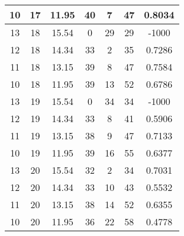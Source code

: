\documentclass[letterpaper, 12pt]{article}
\begin{document}
\begin{longtable}{|c|c|c|c|c|c|c|}
10 & 17 & 11.95 & 40 & 7 & 47 & 0.8034 \\
\hline
13 & 18 & 15.54 & 0 & 29 & 29 & -1000 \\
\hline
12 & 18 & 14.34 & 33 & 2 & 35 & 0.7286 \\
\hline
11 & 18 & 13.15 & 39 & 8 & 47 & 0.7584 \\
\hline
10 & 18 & 11.95 & 39 & 13 & 52 & 0.6786 \\
\hline
13 & 19 & 15.54 & 0 & 34 & 34 & -1000 \\
\hline
12 & 19 & 14.34 & 33 & 8 & 41 & 0.5906 \\
\hline
11 & 19 & 13.15 & 38 & 9 & 47 & 0.7133 \\
\hline
10 & 19 & 11.95 & 39 & 16 & 55 & 0.6377 \\
\hline
13 & 20 & 15.54 & 32 & 2 & 34 & 0.7031 \\
\hline
12 & 20 & 14.34 & 33 & 10 & 43 & 0.5532 \\
\hline
11 & 20 & 13.15 & 38 & 14 & 52 & 0.6355 \\
\hline
10 & 20 & 11.95 & 36 & 22 & 58 & 0.4778 \\
\hline
\end{longtable}
\end{document}
